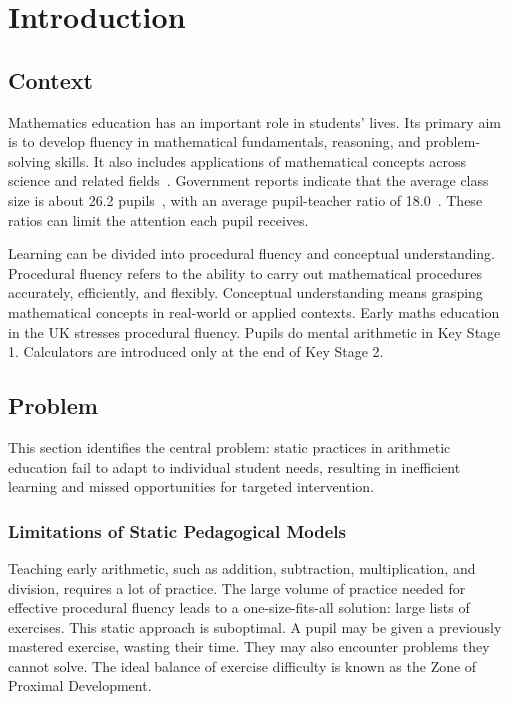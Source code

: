 \chapter{Introduction}

\section{Context}

Mathematics education has an important role in students' lives. Its primary aim is to develop fluency in mathematical fundamentals, reasoning, and problem-solving skills. It also includes applications of mathematical concepts across science and related fields~\autocite{Math_Curriculum_England}. Government reports indicate that the average class size is about 26.2 pupils~\autocite{Class_Size_England}, with an average pupil-teacher ratio of 18.0~\autocite{Pupil_Teacher_Ratio_England}. These ratios can limit the attention each pupil receives.

Learning can be divided into procedural fluency and conceptual understanding. Procedural fluency refers to the ability to carry out mathematical procedures accurately, efficiently, and flexibly. Conceptual understanding means grasping mathematical concepts in real-world or applied contexts. Early maths education in the UK stresses procedural fluency. Pupils do mental arithmetic in Key Stage 1. Calculators are introduced only at the end of Key Stage 2.

\section{Problem}

This section identifies the central problem: static practices in arithmetic education fail to adapt to individual student needs, resulting in inefficient learning and missed opportunities for targeted intervention.

\subsection{Limitations of Static Pedagogical Models}

Teaching early arithmetic, such as addition, subtraction, multiplication, and division, requires a lot of practice. The large volume of practice needed for effective procedural fluency leads to a one-size-fits-all solution: large lists of exercises. This static approach is suboptimal. A pupil may be given a previously mastered exercise, wasting their time. They may also encounter problems they cannot solve. The ideal balance of exercise difficulty is known as the Zone of Proximal Development.

